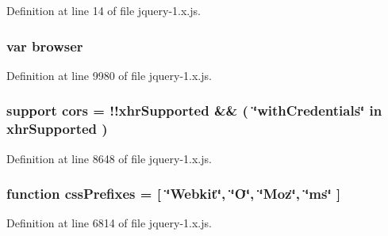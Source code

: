 Definition at line 14 of file jquery-\/1.\+x.\+js.

\subsubsection[{\texorpdfstring{browser}{browser}}]{\setlength{\rightskip}{0pt plus 5cm}var browser}\hypertarget{jquery-1_8x_8js_ad2e233c7f69c182810f01dc9d1a2d546}{}\label{jquery-1_8x_8js_ad2e233c7f69c182810f01dc9d1a2d546}


Definition at line 9980 of file jquery-\/1.\+x.\+js.

\subsubsection[{\texorpdfstring{cors}{cors}}]{ support cors = !!{\bf xhr\+Supported} \&\& ( \char`\"{}with\+Credentials\char`\"{} in {\bf xhr\+Supported} )}\hypertarget{jquery-1_8x_8js_a4b8fe3fdfa8cb03b32c86e4a36575dfc}{}\label{jquery-1_8x_8js_a4b8fe3fdfa8cb03b32c86e4a36575dfc}


Definition at line 8648 of file jquery-\/1.\+x.\+js.

\subsubsection[{\texorpdfstring{css\+Prefixes}{cssPrefixes}}]{\setlength{\rightskip}{0pt plus 5cm}function css\+Prefixes = \mbox{[} \char`\"{}Webkit\char`\"{}, \char`\"{}O\char`\"{}, \char`\"{}Moz\char`\"{}, \char`\"{}ms\char`\"{} \mbox{]}}\hypertarget{jquery-1_8x_8js_a2ed3892172b336458b8074254f4471da}{}\label{jquery-1_8x_8js_a2ed3892172b336458b8074254f4471da}


Definition at line 6814 of file jquery-\/1.\+x.\+js.

